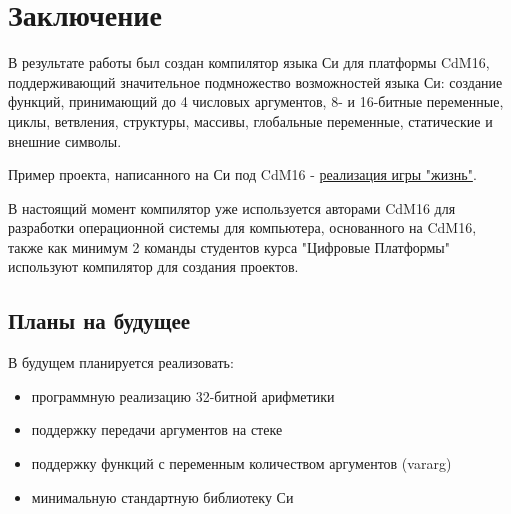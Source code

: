 \documentclass[a4paper,14pt]{extarticle}
\begin{document}
\clearpage %
\section{Заключение}

В результате работы был создан компилятор языка Си для платформы CdM16, поддерживающий значительное подмножество возможностей языка Си: создание функций, принимающий до 4 числовых аргументов, 8- и 16-битные переменные, циклы, ветвления, структуры, массивы, глобальные переменные, статические и внешние символы.

Пример проекта, написанного на Си под CdM16 - \href{https://github.com/leadpogrommer/llvm-project-cdm/tree/backend/cdm/llvm/test_cdm/life_multifile}{реализация игры "жизнь"}.

В настоящий момент компилятор уже используется авторами CdM16 для разработки операционной системы для компьютера, основанного на CdM16\cite{cdm:coconut}, также как минимум 2 команды студентов курса "Цифровые Платформы" используют компилятор для создания проектов.

\subsection{Планы на будущее}

В будущем планируется реализовать:
\begin{itemize}
	\item программную реализацию 32-битной арифметики
	\item поддержку передачи аргументов на стеке
	\item поддержку функций с переменным количеством аргументов (vararg)
	\item минимальную стандартную библиотеку Си
\end{itemize}


\pagebreak
\printbibliography
{}




	
\end{document}
